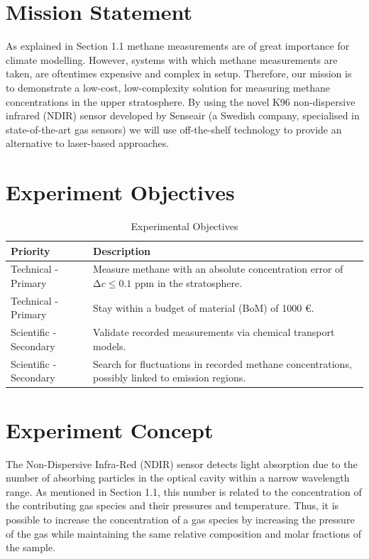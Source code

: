 \documentclass[12pt,a4paper]{report}
\begin{document}
\section{Mission Statement}

As explained in Section 1.1 methane measurements are of great importance for climate modelling. However, systems with which methane measurements are taken, are oftentimes expensive and complex in setup. Therefore, our mission is to demonstrate a low-cost, low-complexity solution for measuring methane concentrations in the upper stratosphere. By using the novel K96 non-dispersive infrared (NDIR) sensor developed by Senseair (a Swedish company, specialised in state-of-the-art gas sensors) \cite{wastine2022} we will use off-the-shelf technology to provide an alternative to laser-based approaches.

\section{Experiment Objectives}

\begin{table}[H]
\centering
\caption{Experimental Objectives}
\label{tab:objectives}
\begin{tabularx}{0.9\textwidth}{lX}
\toprule
\textbf{Priority} & \textbf{Description} \\
\midrule
Technical - Primary & Measure methane with an absolute concentration error of $\mathrm{\Delta}c \leq 0.1$ ppm in the stratosphere. \\
Technical - Primary & Stay within a budget of material (BoM) of 1000 €. \\
Scientific - Secondary & Validate recorded measurements via chemical transport models. \\
Scientific - Secondary & Search for fluctuations in recorded methane concentrations, possibly linked to emission regions. \\
\bottomrule
\end{tabularx}
\end{table}

\section{Experiment Concept}

The Non-Dispersive Infra-Red (NDIR) sensor detects light absorption due to the number of absorbing particles in the optical cavity within a narrow wavelength range. As mentioned in Section 1.1, this number is related to the concentration of the contributing gas species and their pressures and temperature. Thus, it is possible to increase the concentration of a gas species by increasing the pressure of the gas while maintaining the same relative composition and molar fractions of the sample.
\end{document}
